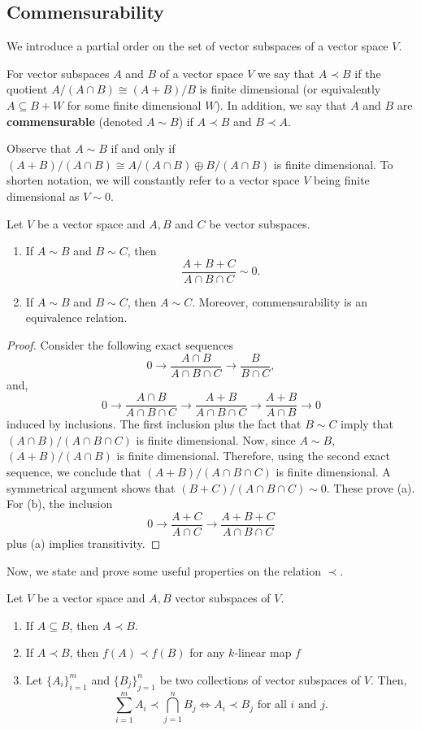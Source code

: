 \subsection{Commensurability}
We introduce a partial order on the set of vector subspaces of a vector space $V$.
\begin{definition}\label{def:commensurability}
	For vector subspaces $A$ and $B$ of a vector space $V$ we say that $A \prec B$ if the quotient $A/(A\cap B) \cong (A+B)/B$ is finite dimensional (or equivalently $A \subseteq B + W$ for some finite dimensional $W$). In addition, we say that $A$ and $B$ are \textbf{commensurable} (denoted $A \sim B$) if $A \prec B$ and $B \prec A$.
\end{definition}
Observe that $A \sim B$ if and only if $(A+B)/(A\cap B) \cong A/(A\cap B) \oplus B/(A \cap B)$ is finite dimensional. To shorten notation, we will constantly refer to a vector space $V$ being finite dimensional as $V \sim 0$.
\begin{proposition}\label{prop:equivalence-relation}
	Let $V$ be a vector space and $A,B$ and $C$ be vector subspaces.
	\begin{enumerate}[label = (\alph*)]
		\item If $A \sim B$ and $B \sim C$, then
		\[
			\frac{A+B+C}{A \cap B \cap C} \sim 0.
		\]
		\item If $A \sim B$ and $B \sim C$, then $A \sim C$. Moreover, commensurability is an equivalence relation.
	\end{enumerate}
\end{proposition}
\begin{proof}
	Consider the following exact sequences
	\[
		0 \to \frac{A\cap B}{A \cap B \cap C} \to \frac{B}{B \cap C}, 
	\]
	and,
	\[
		0 \to \frac{A\cap B}{A \cap B \cap C} \to \frac{A+B}{A \cap B \cap C}
		\to \frac{A+B}{A \cap B} \to 0
	\]
	induced by inclusions. The first inclusion plus the fact that $B \sim C$ imply that $(A\cap B)/(A \cap B \cap C)$ is finite dimensional. Now, since $A \sim B$, $(A+B)/(A \cap B)$ is finite dimensional. Therefore, using the second exact sequence, we conclude that $(A+B)/(A \cap B \cap C)$ is finite dimensional. A symmetrical argument shows that $(B+C)/(A \cap B \cap C) \sim 0$. These prove (a). For (b), the inclusion
	\[
		0 \to \frac{A+C}{A\cap C} \to \frac{A+B+C}{A \cap B \cap C}
	\]
	plus (a) implies transitivity. 
\end{proof}
Now, we state and prove some useful properties on the relation $\prec$.
\begin{lemma}\label{lemm:properties-order-well-behaved-under-operations}
Let $V$ be a vector space and $A,B$ vector subspaces of $V$. 
\begin{enumerate}[label = (\alph*)]
	\item If $A \subseteq B$, then $A \prec B$.
	\item If $A \prec B$, then $f(A) \prec f(B)$ for any $k$-linear map $f$
	\item Let $\{A_{i}\}_{i=1}^{m}$ and $\{B_{j}\}_{j=1}^{n}$ be two collections of vector subspaces of $V$. Then,
	\[
		\sum_{i=1}^{m} A_{i} \prec \bigcap_{j=1}^{n} B_{j} \iff A_{i} \prec B_{j}\text{  for all } i \text{ and } j.
	\]
\end{enumerate}
\end{lemma}
